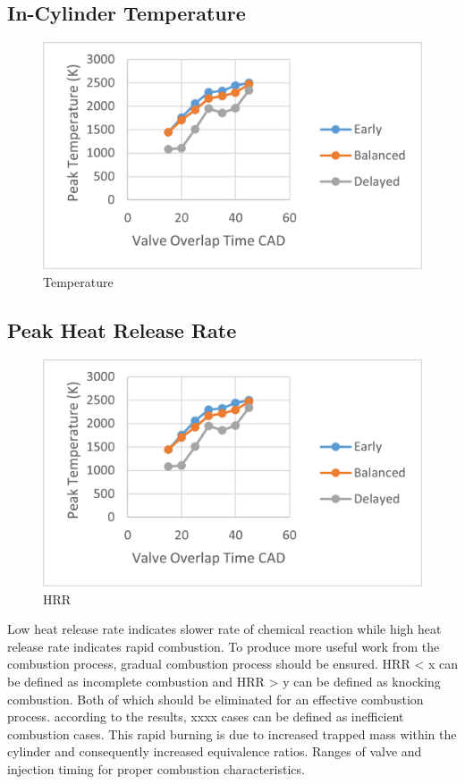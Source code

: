 \documentclass[conference]{IEEEtran}
\begin{document}
\subsection{In-Cylinder Temperature}
\begin{figure}[htbp]
    \centerline{\includegraphics{Plots/temperature.png}}
    \caption{Temperature}
    \label{plt_3}
    \end{figure}

\subsection{Peak Heat Release Rate}
\begin{figure}[htbp]
    \centerline{\includegraphics{Plots/hrr.png}}
    \caption{HRR}
    \label{plt_4}
    \end{figure}

Low heat release rate indicates slower rate of chemical reaction while high heat release rate indicates rapid combustion. To produce more useful work from the combustion process, gradual combustion process should be ensured. 
HRR < x can be defined as incomplete combustion and HRR > y can be defined as knocking combustion. Both of which should be eliminated for an effective combustion process.
according to the results, xxxx cases can be defined as inefficient combustion cases.
This rapid burning is due to increased trapped mass within the cylinder and consequently increased equivalence ratios.
Ranges of valve and injection timing for proper combustion characteristics.
\end{document}
